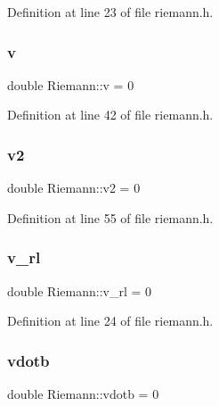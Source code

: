 Definition at line 23 of file riemann.\+h.

\mbox{\label{classRiemann_a0d7d0e062aa88a8451187cc93420285a}} 
\subsubsection{\texorpdfstring{v}{v}}
{\footnotesize\ttfamily double Riemann\+::v = 0\hspace{0.3cm}{\ttfamily [private]}}



Definition at line 42 of file riemann.\+h.

\mbox{\label{classRiemann_a4ceda02ed2bdd7e95a9c9f928888adeb}} 
\subsubsection{\texorpdfstring{v2}{v2}}
{\footnotesize\ttfamily double Riemann\+::v2 = 0\hspace{0.3cm}{\ttfamily [private]}}



Definition at line 55 of file riemann.\+h.

\mbox{\label{classRiemann_a1770759fdc03b69a3f7ffd53d325db74}} 
\subsubsection{\texorpdfstring{v\+\_\+rl}{v\_rl}}
{\footnotesize\ttfamily double Riemann\+::v\+\_\+rl = 0\hspace{0.3cm}{\ttfamily [private]}}



Definition at line 24 of file riemann.\+h.

\mbox{\label{classRiemann_ac4b46c77d0006ae00dbe7d388f77adef}} 
\subsubsection{\texorpdfstring{vdotb}{vdotb}}
{\footnotesize\ttfamily double Riemann\+::vdotb = 0\hspace{0.3cm}{\ttfamily [private]}}



